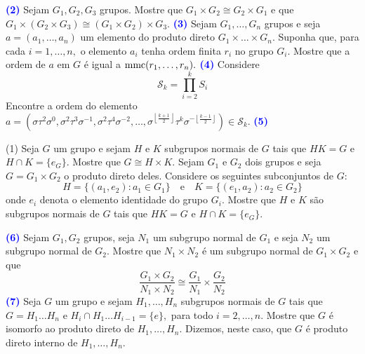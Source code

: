 \documentclass[12pt, a4paper]{article}
\newcommand{\mmc}{{\rm mmc}}
\newcommand{\negrito}[1]{\mbox{\boldmath{$#1$}}}
\begin{document}
\textcolor{blue}{\bf(2)}\label{82} Sejam $G_1, G_2, G_3$ grupos. Mostre que $G_1 \times G_2 \cong G_2 \times G_1$ e que $G_1 \times (G_2 \times G_3) \cong (G_1 \times G_2) \times G_3.$
\newline
\newline
\textcolor{blue}{\bf(3)}\label{83} Sejam $G_1, \ldots, G_n$ grupos e seja $a = (a_1, \ldots, a_n)$ um elemento do produto direto $G_1 \times \ldots \times G_n.$ Suponha que, para cada $i = 1, \ldots, n,$ o elemento $a_i$ tenha ordem finita $r_i$ no grupo $G_i.$ Mostre que a ordem de $a$ em $G$ é igual a $\mmc(r_1, \ldots, r_n).$
\newline\newline
\textcolor{blue}{\bf(4)}\label{84} Considere
\[
\mathcal{S}_k = \prod\limits_{i=2}^k S_i
\]
Encontre a ordem do elemento $a = \left(\sigma \tau^2 \sigma^{0}, \sigma^2 \tau^3 \sigma^{-1}, \sigma^2 \tau^4 \sigma^{-2}, \ldots, \sigma^{\left\lfloor \frac{k+1}{2}\right\rfloor} \tau^k \sigma^{-\left\lfloor \frac{k-1}{2}\right\rfloor}\right) \in \mathcal{S}_k.$
\newline\newline
\textcolor{blue}{\bf(5)}\label{85} \begin{tasks}[counter-format={(tsk[a])},label-width=3.6ex, label-format = {\bfseries}, column-sep = {0pt}](1)
\task[\textcolor{Floresta}{$\negrito{(a)} $}] Seja $G$ um grupo e sejam $H$ e $K$ subgrupos normais de $G$ tais que $HK = G$ e $H \cap K = \{e_G \}.$ Mostre que $G \cong H \times K.$
\task[\textcolor{Floresta}{$\negrito{(b)} $}] Sejam $G_1$ e $G_2$ dois grupos e seja $G = G_1 \times G_2$ o produto direto deles. Considere os seguintes subconjuntos de $G:$
\[
H = \{ (a_1, e_2) : a_1 \in G_1 \} \quad \mbox{e} \quad K = \{(e_1, a_2) : a_2 \in G_2 \}
\]
onde $e_i$ denota o elemento identidade do grupo $G_i.$ Mostre que $H$ e $K$ são subgrupos normais de $G$ tais que $HK = G$ e $H \cap K = \{e_G \}.$
\end{tasks}
\textcolor{blue}{\bf(6)}\label{86} Sejam $G_1, G_2$ grupos, seja $N_1$ um subgrupo normal de $G_1$ e seja $N_2$ um subgrupo normal de $G_2.$ Mostre que $N_1 \times N_2$ é um subgrupo normal de $G_1 \times G_2$ e que
\[
\frac{G_1 \times G_2}{N_1 \times N_2} \cong \frac{G_1}{N_1} \times \frac{G_2}{N_2}
\]
\newline\newline
\textcolor{blue}{\bf(7)}\label{87} Seja $G$ um grupo e sejam $H_1, \ldots, H_n$ subgrupos normais de $G$ tais que $G = H_1\ldots H_n$ e $H_i \cap H_1 \ldots H_{i-1} = \{e \},$ para todo $i = 2, \ldots, n.$ Mostre que $G$ é isomorfo ao produto direto de $H_1, \ldots, H_n.$ Dizemos, neste caso, que $G$ é produto direto interno de $H_1, \ldots, H_n.$
\end{document}
